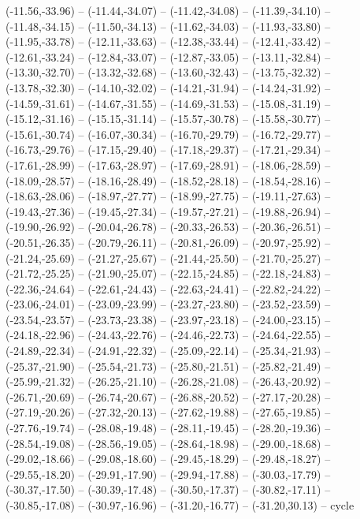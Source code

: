 {  (-11.56,-33.96) -- (-11.44,-34.07) -- (-11.42,-34.08) -- (-11.39,-34.10) -- (-11.48,-34.15) -- (-11.50,-34.13) -- (-11.62,-34.03) --
  (-11.93,-33.80) -- (-11.95,-33.78) -- (-12.11,-33.63) -- (-12.38,-33.44) -- (-12.41,-33.42) -- (-12.61,-33.24) -- (-12.84,-33.07) --
  (-12.87,-33.05) -- (-13.11,-32.84) -- (-13.30,-32.70) -- (-13.32,-32.68) -- (-13.60,-32.43) -- (-13.75,-32.32) -- (-13.78,-32.30) --
  (-14.10,-32.02) -- (-14.21,-31.94) -- (-14.24,-31.92) -- (-14.59,-31.61) -- (-14.67,-31.55) -- (-14.69,-31.53) -- (-15.08,-31.19) --
  (-15.12,-31.16) -- (-15.15,-31.14) -- (-15.57,-30.78) -- (-15.58,-30.77) -- (-15.61,-30.74) -- (-16.07,-30.34) -- (-16.70,-29.79) --
  (-16.72,-29.77) -- (-16.73,-29.76) -- (-17.15,-29.40) -- (-17.18,-29.37) -- (-17.21,-29.34) -- (-17.61,-28.99) -- (-17.63,-28.97) --
  (-17.69,-28.91) -- (-18.06,-28.59) -- (-18.09,-28.57) -- (-18.16,-28.49) -- (-18.52,-28.18) -- (-18.54,-28.16) -- (-18.63,-28.06) --
  (-18.97,-27.77) -- (-18.99,-27.75) -- (-19.11,-27.63) -- (-19.43,-27.36) -- (-19.45,-27.34) -- (-19.57,-27.21) -- (-19.88,-26.94) --
  (-19.90,-26.92) -- (-20.04,-26.78) -- (-20.33,-26.53) -- (-20.36,-26.51) -- (-20.51,-26.35) -- (-20.79,-26.11) -- (-20.81,-26.09) --
  (-20.97,-25.92) -- (-21.24,-25.69) -- (-21.27,-25.67) -- (-21.44,-25.50) -- (-21.70,-25.27) -- (-21.72,-25.25) -- (-21.90,-25.07) --
  (-22.15,-24.85) -- (-22.18,-24.83) -- (-22.36,-24.64) -- (-22.61,-24.43) -- (-22.63,-24.41) -- (-22.82,-24.22) -- (-23.06,-24.01) --
  (-23.09,-23.99) -- (-23.27,-23.80) -- (-23.52,-23.59) -- (-23.54,-23.57) -- (-23.73,-23.38) -- (-23.97,-23.18) -- (-24.00,-23.15) --
  (-24.18,-22.96) -- (-24.43,-22.76) -- (-24.46,-22.73) -- (-24.64,-22.55) -- (-24.89,-22.34) -- (-24.91,-22.32) -- (-25.09,-22.14) --
  (-25.34,-21.93) -- (-25.37,-21.90) -- (-25.54,-21.73) -- (-25.80,-21.51) -- (-25.82,-21.49) -- (-25.99,-21.32) -- (-26.25,-21.10) --
  (-26.28,-21.08) -- (-26.43,-20.92) -- (-26.71,-20.69) -- (-26.74,-20.67) -- (-26.88,-20.52) -- (-27.17,-20.28) -- (-27.19,-20.26) --
  (-27.32,-20.13) -- (-27.62,-19.88) -- (-27.65,-19.85) -- (-27.76,-19.74) -- (-28.08,-19.48) -- (-28.11,-19.45) -- (-28.20,-19.36) --
  (-28.54,-19.08) -- (-28.56,-19.05) -- (-28.64,-18.98) -- (-29.00,-18.68) -- (-29.02,-18.66) -- (-29.08,-18.60) -- (-29.45,-18.29) --
  (-29.48,-18.27) -- (-29.55,-18.20) -- (-29.91,-17.90) -- (-29.94,-17.88) -- (-30.03,-17.79) -- (-30.37,-17.50) -- (-30.39,-17.48) --
  (-30.50,-17.37) -- (-30.82,-17.11) -- (-30.85,-17.08) -- (-30.97,-16.96) -- (-31.20,-16.77) -- (-31.20,30.13) -- cycle}

